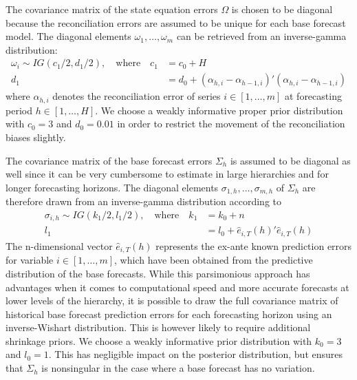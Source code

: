 \documentclass[a4paper,fleqn,11pt]{article}
\begin{document}
The covariance matrix of the state equation errors $\Omega$ is chosen to be diagonal because the reconciliation errors are assumed to be unique for each base forecast model. The diagonal elements $\omega_1, \hdots, \omega_m$ can be retrieved from an inverse-gamma distribution:
\begin{align*}
\omega_i \sim IG(c_1/2,d_1/2), \quad \text{where} \quad c_1 &= c_0 + H\\
	d_1 &= d_0 + (\alpha_{h,i} - \alpha_{h-1,i})'(\alpha_{h,i} - \alpha_{h-1,i})
\end{align*}
where $\alpha_{h,i}$ denotes the reconciliation error of series $i \in [1, \hdots, m]$ at forecasting period $h \in [1, \hdots, H]$. We choose a weakly informative proper prior distribution with $c_0 = 3$ and $d_0 = 0.01$ in order to restrict the movement of the reconciliation biases slightly. 

The covariance matrix of the base forecast errors $\Sigma_h$ is assumed to be diagonal as well since it can be very cumbersome to estimate in large hierarchies and for longer forecasting horizons. The diagonal elements $\sigma_{1,h}, \hdots, \sigma_{m,h}$ of $\Sigma_h$ are therefore drawn from an inverse-gamma distribution according to
\begin{align*}
	\sigma_{i,h} \sim IG(k_1/2,l_1/2), \quad \text{where} \quad k_1 &= k_0 + n\\
	l_1 &= l_0 + \hat{e}_{i,T}(h)'\hat{e}_{i,T}(h)
\end{align*}
The n-dimensional vector $\hat{e}_{i,T}(h)$ represents the ex-ante known prediction errors for variable $i \in [1, \hdots, m]$, which have been obtained from the predictive distribution of the base forecasts. While this parsimonious approach has advantages when it comes to computational speed and more accurate forecasts at lower levels of the hierarchy, it is possible to draw the full covariance matrix of historical base forecast prediction errors for each forecasting horizon using an inverse-Wishart distribution. This is however likely to require additional shrinkage priors. We choose a weakly informative prior distribution with $k_0 = 3$ and $l_0 = 1$. This has negligible impact on the posterior
distribution, but ensures that $\Sigma_h$ is nonsingular in the case where a base forecast has no
variation.
\end{document}

